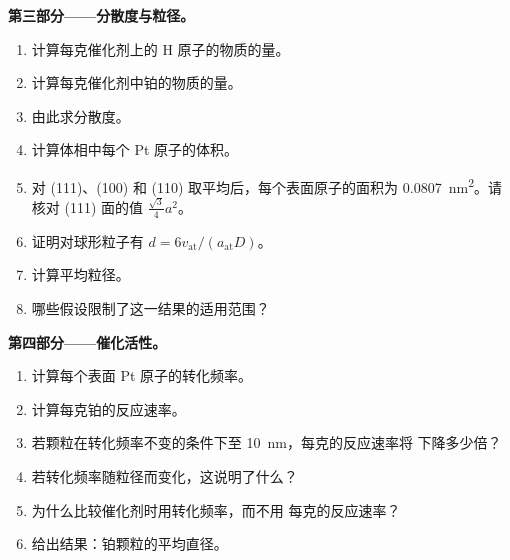 \begin{problem}
\medskip\noindent\textbf{第三部分——分散度与粒径。}
\begin{enumerate}[resume]
  \item 计算每克催化剂上的 H 原子的物质的量。
  \item 计算每克催化剂中铂的物质的量。
  \item 由此求分散度。
  \item 计算体相中每个 Pt 原子的体积。
  \item 对 (111)、(100) 和 (110) 取平均后，每个表面原子的面积为
        \qty{0.0807}{nm^2}。请核对 (111) 面的值 $\frac{\sqrt3}{4}a^2$。
  \item 证明对球形粒子有 $d = 6v_{\mathrm{at}}/(a_{\mathrm{at}}D)$。
  \item 计算平均粒径。
  \item 哪些假设限制了这一结果的适用范围？
\end{enumerate}

\medskip\noindent\textbf{第四部分——催化活性。}
\begin{enumerate}[resume]
  \item 计算每个表面 Pt 原子的转化频率。
  \item 计算每克铂的反应速率。
  \item 若颗粒在转化频率不变的条件下至 \qty{10}{nm}，每克的反应速率将
        下降多少倍？
  \item 若转化频率随粒径而变化，这说明了什么？
  \item 为什么比较催化剂时用转化频率，而不用
        每克的反应速率？
  \item 给出结果：铂颗粒的平均直径。
\end{enumerate}
\end{problem}
